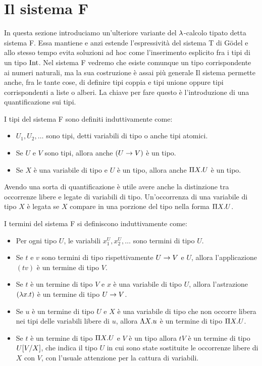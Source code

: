 \documentclass[]{marticle}
\begin{document}
\section{Il sistema F}

In questa sezione introduciamo un'ulteriore variante del $\l$-calcolo tipato
detta sistema F. Essa mantiene e anzi estende l'espressivit\`a del sistema T di
G\"odel e allo stesso tempo evita soluzioni ad hoc come l'inserimento esplicito
fra i tipi di un tipo $\tint$. Nel sistema F vedremo che esiste comunque un tipo
corrispondente ai numeri naturali, ma la sua costruzione \`e assai pi\`u
generale Il sistema permette anche, fra le tante cose, di definire tipi coppia e
tipi unione oppure tipi corrispondenti a liste o alberi. La chiave per fare
questo \`e l'introduzione di una quantificazione sui tipi.

\begin{block}[Definizione]
    I tipi del sistema F sono definiti induttivamente come:
    \begin{itemize}
        \item $U_1, U_2, \dots$ sono tipi, detti variabili di tipo o anche tipi
            atomici.
        \item Se $U$ e $V$ sono tipi, allora anche $(U\rar V)$ \`e un tipo.
        \item Se $X$ \`e una variabile di tipo e $U$ \`e un tipo, allora anche
            $\P X. U$ \`e un tipo.
    \end{itemize}
\end{block}

Avendo una sorta di quantificazione \`e utile avere anche la distinzione tra
occorrenze libere e legate di variabili di tipo. Un'occorrenza di una variabile
di tipo $X$ \`e legata se $X$ compare in una porzione del tipo nella forma $\P
X. U$.

\begin{block}[Definizione]
    I termini del sistema F si definiscono induttivamente come:
    \begin{itemize}
        \item Per ogni tipo $U$, le variabili $x^U_1, x^U_2, \dots$ sono termini
            di tipo $U$.
        \item Se $t$ e $v$ sono termini di tipo rispettivamente $U\rar V$ e $U$,
            allora l'applicazione $(tv)$ \`e un termine di tipo $V$.
        \item Se $t$ \`e un termine di tipo $V$ e $x$ \`e una variabile di tipo
            $U$, allora l'astrazione $(\l x.  t)$ \`e un termine di tipo $U\rar
            V$.
        \item Se $u$ \`e un termine di tipo $U$ e $X$ \`e una variabile di tipo
            che non occorre libera nei tipi delle variabili libere di $u$,
            allora $\L X. u$ \`e un termine di tipo $\P X.U$. 
        \item Se $t$ \`e un termine di tipo $\P X. U$ e $V$ \`e un tipo allora
            $tV$ \`e un termine di tipo $U\sub{V}{X}$, che indica il tipo $U$
            in cui sono state sostituite le occorrenze libere di $X$ con $V$,
            con l'usuale attenzione per la cattura di variabili.
    \end{itemize}
\end{block}
\end{document}
